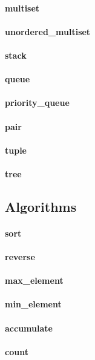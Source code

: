 \documentclass[8pt, a4paper, twocolumn]{article}
\begin{document}
\paragraph{multiset}
\paragraph{unordered\_multiset}
\paragraph{stack}
\paragraph{queue}
\paragraph{priority\_queue}
\paragraph{pair}
\paragraph{tuple}
\paragraph{tree}

\subsection{Algorithms}
\paragraph{sort}
\paragraph{reverse}
\paragraph{max\_element}
\paragraph{min\_element}
\paragraph{accumulate}
\paragraph{count}
\end{document}
